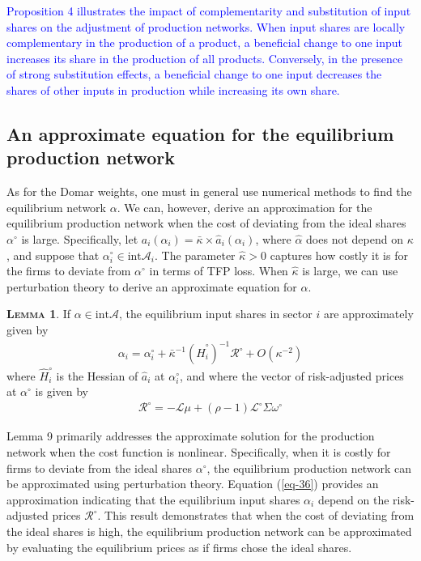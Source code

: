 \documentclass[11pt]{article}
\theoremstyle{definition}
\newtheorem{lemma}{\noindent \textbf{\textsc{Lemma}}}
\begin{document}
	\textcolor{blue}{Proposition 4 illustrates the impact of complementarity and substitution of input shares on the adjustment of production networks. When input shares are locally complementary in the production of a product, a beneficial change to one input increases its share in the production of all products. Conversely, in the presence of strong substitution effects, a beneficial change to one input decreases the shares of other inputs in production while increasing its own share.}
	
	\subsection*{An approximate equation for the equilibrium production network}
	As for the Domar weights, one must in general use numerical methods to find the equilibrium network $\alpha$. We can, however, derive an approximation for the equilibrium production network when the cost of deviating from the ideal shares $\alpha^{\circ}$ is large. Specifically, let $a_i (\alpha_i) = \bar{\kappa} \times \hat{a}_i (\alpha_i)$, where $\hat{\alpha}$ does not depend on $\kappa$, and suppose that $\alpha_i^{\circ}\in\text{int}\mathcal{A}_i$. The parameter $\hat{\kappa}>0$ captures how costly it is for the firms to deviate from $\alpha^{\circ}$ in terms of TFP loss. When $\hat{\kappa}$ is large, we can use perturbation theory to derive an approximate equation for $\alpha$.
	
	\begin{lemma}
		If $\alpha\in\text{int}\mathcal{A}$, the equilibrium input shares in sector $i$ are approximately given by
		\begin{align}
			\alpha_i = \alpha_i^{\circ} + \bar{\kappa}^{-1} \left(\hat{H}_i^{\circ}\right)^{-1} \mathcal{R}^{\circ} + O(\kappa^{-2}) \label{eq-36}
		\end{align}
		where $\hat{H}_i^{\circ}$ is the Hessian of $\hat{a}_i$ at $\alpha_i^{\circ}$, and where the vector of risk-adjusted prices at $\alpha^{\circ}$ is given by
		\begin{align*}
			\mathcal{R}^{\circ} = -\mathcal{L}\mu + (\rho - 1)\mathcal{L}^{\circ}\Sigma\omega^{\circ}
		\end{align*}
	\end{lemma}

	Lemma 9 primarily addresses the approximate solution for the production network when the cost function is nonlinear. Specifically, when it is costly for firms to deviate from the ideal shares \(\alpha^\circ\), the equilibrium production network can be approximated using perturbation theory. Equation (\ref{eq-36}) provides an approximation indicating that the equilibrium input shares \(\alpha_i\) depend on the risk-adjusted prices \(\mathcal{R}^\circ\). This result demonstrates that when the cost of deviating from the ideal shares is high, the equilibrium production network can be approximated by evaluating the equilibrium prices as if firms chose the ideal shares.
\end{document}
